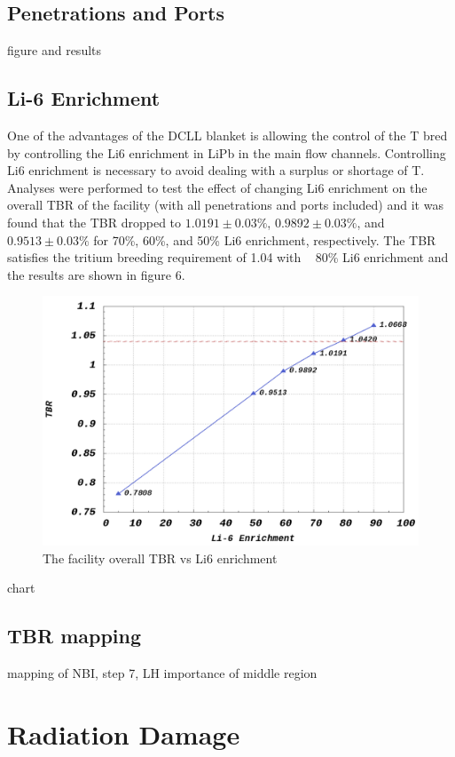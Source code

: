 \documentclass[12pt, letterpaper]{elsarticle}
\begin{document}
\subsection{Penetrations and Ports}
figure and results
\subsection{Li-6 Enrichment}
One of the advantages of the DCLL blanket is allowing the control of the T bred by controlling the  Li6 enrichment in LiPb in the main flow channels. Controlling Li6 enrichment is necessary to avoid dealing with a surplus or shortage of T. Analyses were performed to test the effect of changing Li6 enrichment on the overall TBR of the facility (with all penetrations and ports included) and it was found that the TBR dropped to $1.0191\pm 0.03\%$, $0.9892\pm 0.03\%$, and $0.9513\pm 0.03\%$ for 70\%, 60\%, and 50\% Li6  enrichment, respectively. The TBR satisfies the tritium breeding requirement of 1.04 with ~ 80\% Li6 enrichment and the results are shown in figure 6.

\begin{figure}[h!]
  \centering
  \includegraphics[scale=0.25]{../plots/Li6_enrichment.png}
  \caption{The facility overall TBR vs Li6 enrichment}
  \label{fig:Li6_enrichment}
\end{figure}
chart
\subsection{TBR mapping}
mapping of NBI, step 7, LH
importance of middle region
\section{Radiation Damage}
\end{document}
